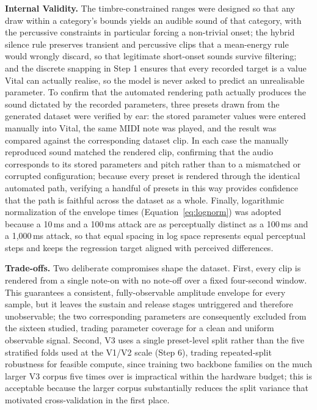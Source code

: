 \par \vspace{0.3cm}
\noindent\textbf{Internal Validity.} The timbre-constrained ranges were designed so that any draw within a category's bounds yields an audible sound of that category, with the percussive constraints in particular forcing a non-trivial onset; the hybrid silence rule preserves transient and percussive clips that a mean-energy rule would wrongly discard, so that legitimate short-onset sounds survive filtering; and the discrete snapping in Step 1 ensures that every recorded target is a value Vital can actually realise, so the model is never asked to predict an unrealisable parameter. To confirm that the automated rendering path actually produces the sound dictated by the recorded parameters, three presets drawn from the generated dataset were verified by ear: the stored parameter values were entered manually into Vital, the same MIDI note was played, and the result was compared against the corresponding dataset clip. In each case the manually reproduced sound matched the rendered clip, confirming that the audio corresponds to its stored parameters and pitch rather than to a mismatched or corrupted configuration; because every preset is rendered through the identical automated path, verifying a handful of presets in this way provides confidence that the path is faithful across the dataset as a whole. Finally, logarithmic normalization of the envelope times (Equation~\ref{eq:lognorm}) was adopted because a 10\,ms and a 100\,ms attack are as perceptually distinct as a 100\,ms and a 1{,}000\,ms attack, so that equal spacing in log space represents equal perceptual steps and keeps the regression target aligned with perceived differences.

\par \vspace{0.3cm}
\noindent\textbf{Trade-offs.} Two deliberate compromises shape the dataset. First, every clip is rendered from a single note-on with no note-off over a fixed four-second window. This guarantees a consistent, fully-observable amplitude envelope for every sample, but it leaves the sustain and release stages untriggered and therefore unobservable; the two corresponding parameters are consequently excluded from the sixteen studied, trading parameter coverage for a clean and uniform observable signal. Second, V3 uses a single preset-level split rather than the five stratified folds used at the V1/V2 scale (Step 6), trading repeated-split robustness for feasible compute, since training two backbone families on the much larger V3 corpus five times over is impractical within the hardware budget; this is acceptable because the larger corpus substantially reduces the split variance that motivated cross-validation in the first place.

